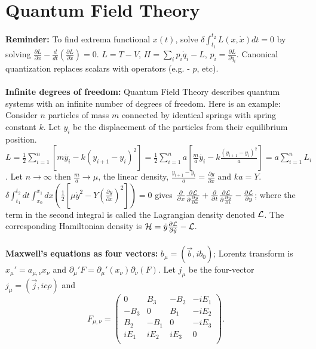 \section{Quantum Field Theory}
{\bf Reminder:} To find extrema functional $x(t)$, 
solve $\delta \int_{t_1}^{t_2} L(x, \dot{x}) dt= 0$ by solving
${\frac {\partial L} {\partial x}}- {\frac {d} {dt}} 
({\frac {\partial L} {\partial {\dot x}}})= 0$.
$L=T-V$, $H= \sum_i p_i {\dot q}_i -L$, $p_i= {\frac {\partial L}{\partial {\dot{q}_i}}}$.  
Canonical quantization replaces
scalars with operators (e.g. - $p$, etc).  
\\
\\
{\bf Infinite degrees of freedom:}
Quantum Field Theory describes quantum systems with an infinite number of degrees of freedom.
Here is an example:
Consider $n$ particles of mass $m$ connected by identical springs with spring 
constant $k$.  Let $y_i$ be the displacement of the
particles from their equilibrium position.
$L
= {\frac 1 2} \sum_{i=1}^n [m \dot{y_i}-k(y_{i+1}-y_i)^2]
= {\frac 1 2} \sum_{i=1}^n a [{\frac m a} \dot{y_i}-k {\frac {(y_{i+1}-y_i)^2} a}]
= a \sum_{i=1}^n L_i $.  Let 
$n \rightarrow \infty$ then ${\frac m a} \rightarrow \mu$, the linear density,
${\frac {y_{i+1}-y_i} a}= {\frac {\partial y} {\partial x}}$ and $ka= Y$.
$\delta \int_{t_1}^{t_2} dt \int_{x_0}^{x_1} dx ({\frac 1 2} 
[\mu {\dot{y}}^2 - Y ({\frac {\partial y}{\partial x}})^2])= 0$ gives
$
{\frac {\partial} {\partial x}} {\frac {\partial {\cal L}} {\partial {\frac {\partial y} {\partial x}}}} +
{\frac {\partial} {\partial t}} {\frac {\partial {\cal L}} {\partial {\frac {\partial y} {\partial t}}}} -
{\frac {\partial {\cal L}} {\partial y}}$; where the term in the second integral 
is called the Lagrangian density denoted ${\cal L}$.  The corresponding Hamiltonian density is
${\cal H}= \dot{y} {\frac {\partial {\cal L}} {\partial {\dot{y}}}}- {\cal L}
$.
\\
\\
{\bf Maxwell's equations as four vectors:}  
$b_{\mu}= ( {\vec b}, i b_0)$; Lorentz transform is $x_{\mu}'= a_{\mu, \nu} x_{\nu}$ and
$\partial_{\mu}' F = \partial_{\mu}' (x_{\nu}) \partial_{\nu} (F)$.
Let $j_{\mu}$ be the four-vector
$j_{\mu}= ({\vec j}, ic \rho)$ and
$$F_{\mu, \nu}=
\left(
\begin{array}{cccc}
0 & B_3 & -B_2 & -iE_1 \\
-B_3 & 0 & B_1 & -iE_2 \\
B_2 & -B_1 & 0 & -iE_3 \\
iE_1 & iE_2 & iE_3 & 0 \\
\end{array}
\right).$$  
